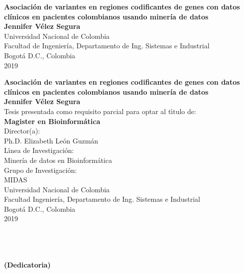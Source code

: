 \begin{center}
\begin{figure}
\centering%
\end{figure}
\thispagestyle{empty} \vspace*{0cm} \textbf{\huge
Asociación de variantes en regiones codificantes de genes con datos clínicos en
pacientes colombianos usando minería de datos}\\[5.0cm]
\Large\textbf{Jennifer Vélez Segura}\\[5.0cm]
\small Universidad Nacional de Colombia\\
Facultad de Ingeniería, Departamento de Ing. Sistemas e Industrial\\
Bogotá D.C., Colombia\\
2019\\
\end{center}

\newpage{\pagestyle{empty}\cleardoublepage}

\newpage
\begin{center}
\thispagestyle{empty} \vspace*{0cm} \textbf{\huge
Asociación de variantes en regiones codificantes de genes con datos clínicos en
pacientes colombianos usando minería de datos}\\[2.0cm]
\Large\textbf{Jennifer Vélez Segura}\\[2.0cm]
\small Tesis presentada como requisito parcial para optar al
t\'{\i}tulo de:\\
\textbf{Magister en Bioinformática}\\[2.5cm]
Director(a):\\
Ph.D. Elizabeth León Guzmán\\[2.0cm]
L\'{\i}nea de Investigaci\'{o}n:\\
Minería de datos en Bioinformática\\
Grupo de Investigaci\'{o}n:\\
MIDAS\\[2.5cm]
Universidad Nacional de Colombia\\
Facultad Ingeniería, Departamento de Ing. Sistemas e Industrial\\
Bogotá D.C., Colombia\\
2019 \\
\end{center}

\newpage{\pagestyle{empty}\cleardoublepage}

\newpage
\thispagestyle{empty} \textbf{}\normalsize
\\\\\\%
\textbf{(Dedicatoria)}\\[4.0cm]

